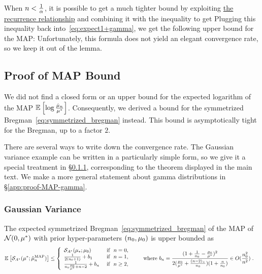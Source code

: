 \begin{subappendices}
When $n<\frac{1}{\alpha}$, it is possible to get a much tighter bound by exploiting \href{http://dlmf.nist.gov/8.19.E12}{the recurrence relationship} \cite[Eq.~8.19.12]{DLMF}
and combining it with the inequality \citep[Eq.~8.19.21]{DLMF} to get
Plugging this inequality back into~\eqref{eq:expect1+gamma}, we get the following upper bound for the MAP:
Unfortunately, this formula does not yield an elegant convergence rate, so we keep it out of the lemma. 


\subsection{Proof of MAP Bound}
\label{app:MAP-bound}

We did not find a closed form or an upper bound for the expected logarithm of the MAP $\mathbb{E}_{} \left[ \log\frac{\hat {\mu}_n}{\mu^*} \right] $.
Consequently, we derived a bound for the symmetrized Bregman~\eqref{eq:symmetrized_bregman} instead. 
This bound is asymptotically tight for the Bregman, up to a factor $2$.

There are several ways to write down the convergence rate. The Gaussian variance example can be written in a particularly simple form, so we give  it a special treatment in \S\ref{app:proof-MAP-gaussian}, corresponding to the theorem displayed in the main text.
We make a more general statement about gamma distributions in \S\ref{app:proof-MAP-gamma}.


\subsubsection{Gaussian Variance}
\label{app:proof-MAP-gaussian}

\begin{theorem}
The expected symmetrized Bregman~\eqref{eq:symmetrized_bregman} of the MAP of ${\mathcal N}(  0,\mu^*)$ with prior hyper-parameters $(n_0,\mu_0)$ is upper bounded as
 \begin{align}
	& \mathbb{E}_{} \left[ {\mathcal S}_{A^*}( \mu^*; \hat {\mu}_n^\mathrm{MAP}) \right] 
	\leq 
	\left\{\begin{array}{ll}
		{\mathcal S}_{A^*}( \mu_*; \mu_0) 					& \text{ if } \ n=0, \\
		\frac{1}{2(n_0+1)}  +  b_1 						& \text{ if }\ n=1,\\
		\frac{1}{n_0 \frac{\mu_0}{\mu^*} +n-2} + b_n  & \text{ if }\ n\geq 2,
	\end{array}\right.
	\quad 
	\quad 
	\text{where }
	b_n = \frac{(1 + \frac{1}{n_0} - \frac{\mu_0}{\mu^*})^2}{2 (\frac{\mu_0}{\mu^*}+\frac{(n-2)_+}{n_0})(1 + \frac{n}{n_0} )} \in O(\frac{n_0^2}{n^2}) \; . 
\end{align}
\end{theorem} 


\end{subappendices}
